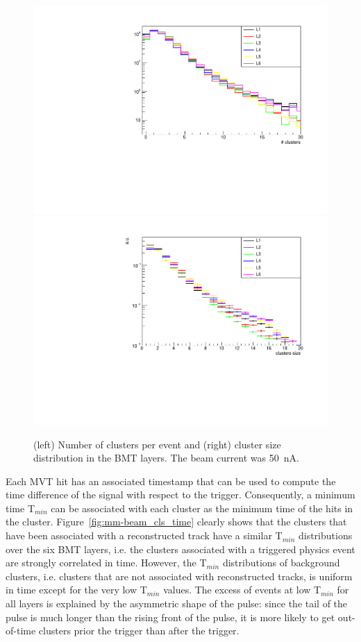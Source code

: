 \begin{figure}[!htb]
 \includegraphics[width=.49\columnwidth,keepaspectratio]{images/beam_num_cls.pdf}
 \includegraphics[width=.49\columnwidth,keepaspectratio]{images/beam_cls_size.pdf}
 \caption{(left) Number of clusters per event and (right) cluster size distribution in the BMT layers. The beam current was 50~nA.}
 \label{fig:mm-beam_cls}
\end{figure}

Each MVT hit has an associated timestamp that can be used to compute the time difference of the signal with respect to the
trigger. Consequently, a minimum time T$_{min}$ can be associated with each cluster as the minimum time of the hits in the cluster.
Figure~\ref{fig:mm-beam_cls_time} clearly shows that the clusters that have been associated with a reconstructed track have
a similar T$_{min}$ distributions over the six BMT layers, i.e. the clusters associated with a triggered physics event are strongly
correlated in time. However, the T$_{min}$ distributions of background clusters, i.e. clusters that are not associated with reconstructed tracks, 
 is uniform in time except for the very low T$_{min}$ values. The excess of events at low T$_{min}$ for all layers is explained by the asymmetric shape of the pulse: since the tail of the pulse is much longer than the rising front of the pulse, it is more likely to get out-of-time clusters prior the trigger than after the trigger.

